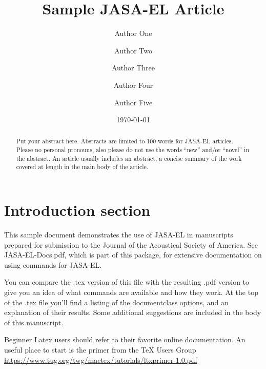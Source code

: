 \documentclass[trackchanges]{JASA-EL}
\begin{document}
\title[JASA-EL/Sample JASA-EL Article]{Sample JASA-EL Article}
\author{Author One}
\author{Author Two}
\author{Author Three}
\author{Author Four}
\correspondingauthor
\author{Author Five}			

\date{\today} 

\begin{abstract}
Put your abstract here. Abstracts are limited to 100 words for
JASA-EL
articles. Please no
personal pronouns, also please do not use the words ``new'' and/or
``novel'' in the abstract. An article usually includes an abstract, a
concise summary of the work covered at length in the main body of the
article.     
\end{abstract}


\maketitle


\section{\label{sec:1} Introduction section}
This sample document demonstrates the use of JASA-EL in manuscripts 
prepared for submission to the Journal of the Acoustical Society of America.  
See JASA-EL-Docs.pdf, which is part of this package, for extensive
documentation on using commands for JASA-EL.

You can compare the .tex version of this file with the resulting .pdf
version to give you an idea of what  commands are available and how
they work. At the top of the .tex file you'll find a listing of the
documentclass options, and an explanation of their results.
Some additional suggestions are included in the body of this
manuscript.  

  Beginner Latex users should refer to their favorite online
  documentation. An
  useful place to start is the primer from the TeX Users Group 
  \url{https://www.tug.org/twg/mactex/tutorials/ltxprimer-1.0.pdf}
\end{document}
